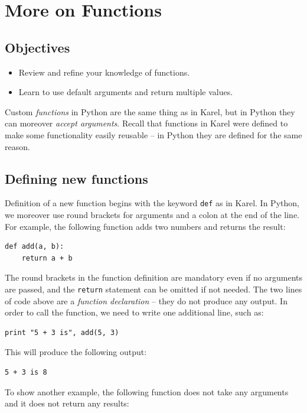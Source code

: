 \section{More on Functions}

\subsection{Objectives}

\begin{itemize}
\item Review and refine your knowledge of functions.
\item Learn to use default arguments and return multiple values.
\end{itemize}
Custom {\em functions} in Python are the same thing as in Karel, 
but in Python they can moreover {\em accept arguments}. Recall that 
functions in Karel were defined to make some functionality easily 
reusable -- in Python they are defined for the same reason.

\subsection{Defining new functions}

Definition of a new function begins with the keyword {\tt def} as in Karel. In Python,
we moreover use round brackets for arguments and a colon at the end of the line. 
For example, the following function adds two numbers
and returns the result:

\begin{verbatim}
def add(a, b):
    return a + b
\end{verbatim}
The round brackets in the function definition are mandatory even if no arguments are passed,
and the {\tt return} statement can be omitted if not needed.
The two lines of code above 
are a {\em function declaration} -- they do not produce any output.
In order to call the function, we need to write one additional line, such as:

\begin{verbatim}
print "5 + 3 is", add(5, 3)
\end{verbatim}
This will produce the following output:

\begin{verbatim}
5 + 3 is 8
\end{verbatim}
To show another example, the following function does not take any arguments 
and it does not return any results:

